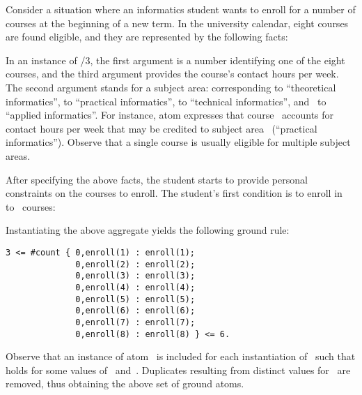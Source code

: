 \begin{example}\label{ex:aggr}
Consider a situation where an informatics student
wants to enroll for a number of courses at the beginning of a new term.
In the university calendar, eight courses are found eligible,
and they are represented by the following facts:
%

%
In an instance of /$3$,
the first argument is a number identifying one of the eight courses,
and the third argument provides the course's contact hours per week.
The second argument stands for a subject area:
 corresponding to ``theoretical informatics'',
               to ``practical informatics'',
               to ``technical informatics'',
and~               to ``applied informatics''.
For instance, atom 
expresses that course~ accounts for~ contact hours per week
that may be credited to subject area~ (``practical informatics'').
Observe that a single course is usually eligible for multiple
subject areas.

After specifying the above facts,
the student starts to provide personal constraints on the courses to enroll.
The student's first condition is to enroll in~ to~ courses:
%

%
Instantiating the above  aggregate
yields the following ground rule:%
%
\begin{lstlisting}[numbers=none]
3 <= #count { 0,enroll(1) : enroll(1);
              0,enroll(2) : enroll(2);
              0,enroll(3) : enroll(3);
              0,enroll(4) : enroll(4);
              0,enroll(5) : enroll(5);
              0,enroll(6) : enroll(6);
              0,enroll(7) : enroll(7);
              0,enroll(8) : enroll(8) } <= 6.
\end{lstlisting}
%
Observe that an instance of atom~ is included for each
instantiation of~ such that 
holds for some values of~ and~.
Duplicates resulting from distinct values for~ are removed, thus
obtaining the above set of ground atoms.


\end{example}

